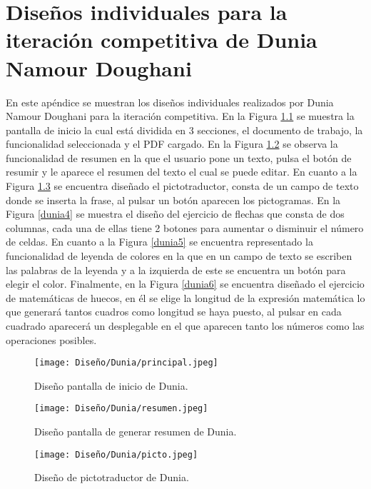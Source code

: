 \chapter{Diseños individuales para la iteración competitiva de Dunia Namour Doughani}
\label{ape:disenyoDunia}

En este apéndice se muestran los diseños individuales realizados por Dunia Namour Doughani para la iteración competitiva. En la Figura \ref{dunia1} se muestra la pantalla de inicio la cual está dividida en 3 secciones, el documento de trabajo, la funcionalidad seleccionada y el PDF cargado. En la Figura \ref{dunia2} se observa la funcionalidad de resumen en la que el usuario pone un texto, pulsa el botón de resumir y le aparece el resumen del texto el cual se puede editar. En cuanto a la Figura \ref{dunia3} se encuentra diseñado el pictotraductor, consta de un campo de texto donde se inserta la frase, al pulsar un botón aparecen los pictogramas. En la Figura \ref{dunia4} se muestra el diseño del ejercicio de flechas que consta de dos columnas, cada una de ellas tiene 2 botones para aumentar o disminuir el número de celdas. En cuanto a la Figura \ref{dunia5} se encuentra representado la funcionalidad de leyenda de colores en la que en un campo de texto se escriben las palabras de la leyenda y a la izquierda de este se encuentra un botón para elegir el color. Finalmente, en la Figura \ref{dunia6} se encuentra diseñado el ejercicio de matemáticas de huecos, en él se elige la longitud de la expresión matemática lo que generará tantos cuadros como longitud se haya puesto, al pulsar en cada cuadrado aparecerá un desplegable en el que aparecen tanto los números como las operaciones posibles. 

  \begin{figure}[ht!]
    \centering
    \texttt{[image: Diseño/Dunia/principal.jpeg]}
    \caption{Diseño pantalla de inicio de Dunia.}
    \label{dunia1}
  \end{figure}

  \begin{figure}[ht!]
    \centering
    \texttt{[image: Diseño/Dunia/resumen.jpeg]}
    \caption{Diseño pantalla de generar resumen de Dunia.}
    \label{dunia2}
  \end{figure}

  \begin{figure}[ht!]
    \centering
    \texttt{[image: Diseño/Dunia/picto.jpeg]}
    \caption{Diseño de pictotraductor de Dunia.}
    \label{dunia3}
  \end{figure}

